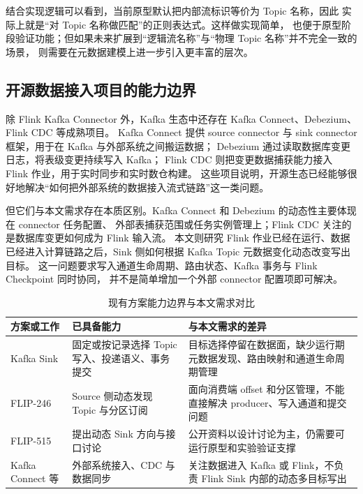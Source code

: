 结合实现逻辑可以看到，当前原型默认把内部流标识等价为 Topic 名称，因此
 实际上就是“对 Topic 名称做匹配”的正则表达式。这样做实现简单，
也便于原型阶段验证功能；但如果未来扩展到“逻辑流名称”与“物理 Topic 名称”并不完全一致的场景，
则需要在元数据建模上进一步引入更丰富的层次。

\subsection{开源数据接入项目的能力边界}

除 Flink Kafka Connector 外，Kafka 生态中还存在 Kafka Connect、Debezium、Flink CDC 等成熟项目。
Kafka Connect 提供 source connector 与 sink connector 框架，用于在 Kafka 与外部系统之间搬运数据\cite{kafkaConnectDocs}；
Debezium 通过读取数据库变更日志，将表级变更持续写入 Kafka\cite{debeziumDocs}；
Flink CDC 则把变更数据捕获能力接入 Flink 作业，用于实时同步和实时数仓构建\cite{flinkCdcDocs}。
这些项目说明，开源生态已经能够很好地解决“如何把外部系统的数据接入流式链路”这一类问题。

但它们与本文需求存在本质区别。Kafka Connect 和 Debezium 的动态性主要体现在 connector 任务配置、
外部表捕获范围或任务实例管理上；Flink CDC 关注的是数据库变更如何成为 Flink 输入流。
本文则研究 Flink 作业已经在运行、数据已经进入计算链路之后，Sink 侧如何根据 Kafka Topic 元数据变化动态改变写出目标。
这一问题要求写入通道生命周期、路由状态、Kafka 事务与 Flink Checkpoint 同时协同，
并不是简单增加一个外部 connector 配置项即可解决。

\begin{table}[htbp]
  \centering
  \caption{现有方案能力边界与本文需求对比}
  \label{tab:related-capability-gap}
  \small
  \begin{tabular}{p{}p{}p{}}
    \toprule
    方案或工作 & 已具备能力 & 与本文需求的差异 \\
    \midrule
    Kafka Sink & 固定或按记录选择 Topic 写入、投递语义、事务提交 & 目标选择停留在数据面，缺少运行期元数据发现、路由映射和通道生命周期管理 \\
    FLIP-246 & Source 侧动态发现 Topic 与分区订阅 & 面向消费端 offset 和分区管理，不能直接解决 producer、写入通道和提交问题 \\
    FLIP-515 & 提出动态 Sink 方向与接口讨论 & 公开资料以设计讨论为主，仍需要可运行原型和实验验证支撑 \\
    Kafka Connect 等 & 外部系统接入、CDC 与数据同步 & 关注数据进入 Kafka 或 Flink，不负责 Flink Sink 内部的动态多目标写出 \\
    \bottomrule
  \end{tabular}
\end{table}

